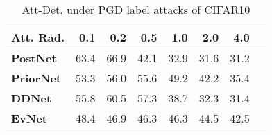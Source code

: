 \begin{table}[t]
\begin{minipage}{0.33\textwidth}
{\begin{tabular}{lrrrrrrr}
\textbf{Att. Rad.} &   0.1 &   0.2 &   0.5 &   1.0 &   2.0 &   4.0 \\
\midrule
\textbf{PostNet } &  63.4 &  66.9 &  42.1 &  32.9 &  31.6 &  31.2 \\
\textbf{PriorNet} &  53.3 &  56.0 &  55.6 &  49.2 &  42.2 &  35.4 \\
\textbf{DDNet   } &  55.8 &  60.5 &  57.3 &  38.7 &  32.3 &  31.4 \\
\textbf{EvNet   } &  48.4 &  46.9 &  46.3 &  46.3 &  44.5 &  42.5 \\
\bottomrule
\end{tabular}
}
            \caption{Att-Det. under PGD label attacks of CIFAR10}
        \end{minipage}
    \end{table}

